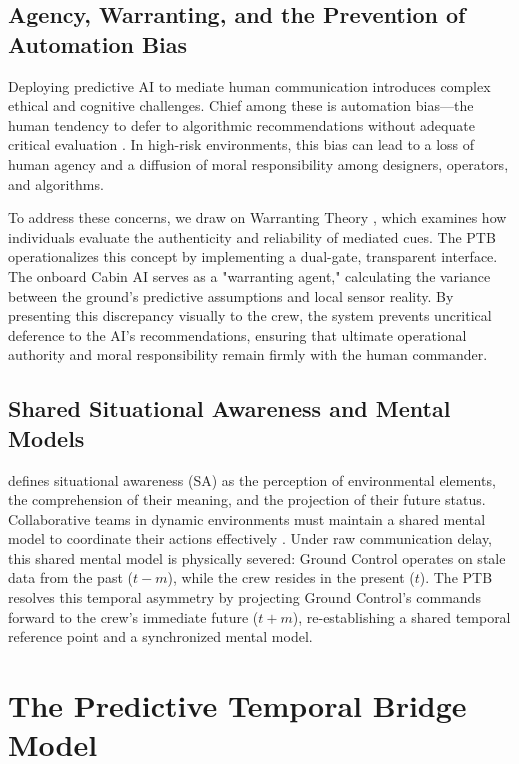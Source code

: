 \documentclass[12pt,a4paper]{article}
\begin{document}
\subsection{Agency, Warranting, and the Prevention of Automation Bias}

Deploying predictive AI to mediate human communication introduces complex ethical and cognitive challenges. Chief among these is automation bias---the human tendency to defer to algorithmic recommendations without adequate critical evaluation \citep{hancock2020}. In high-risk environments, this bias can lead to a loss of human agency and a diffusion of moral responsibility among designers, operators, and algorithms.

To address these concerns, we draw on Warranting Theory \citep{walther1996}, which examines how individuals evaluate the authenticity and reliability of mediated cues. The PTB operationalizes this concept by implementing a dual-gate, transparent interface. The onboard Cabin AI serves as a "warranting agent," calculating the variance between the ground's predictive assumptions and local sensor reality. By presenting this discrepancy visually to the crew, the system prevents uncritical deference to the AI's recommendations, ensuring that ultimate operational authority and moral responsibility remain firmly with the human commander.

\subsection{Shared Situational Awareness and Mental Models}

\citet{endsley1995} defines situational awareness (SA) as the perception of environmental elements, the comprehension of their meaning, and the projection of their future status. Collaborative teams in dynamic environments must maintain a shared mental model to coordinate their actions effectively \citep{salas1995}. Under raw communication delay, this shared mental model is physically severed: Ground Control operates on stale data from the past (\(t - m\)), while the crew resides in the present (\(t\)). The PTB resolves this temporal asymmetry by projecting Ground Control's commands forward to the crew's immediate future (\(t + m\)), re-establishing a shared temporal reference point and a synchronized mental model.

\section{The Predictive Temporal Bridge Model}
\end{document}
